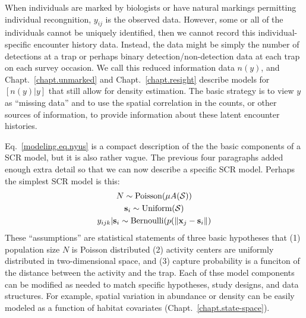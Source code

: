 When individuals are marked by biologists or have natural markings
permitting individual recongnition, $y_{ij}$ is the observed
data. However, some or all of the individuals cannot be uniquely
identified, then we cannot record this individual-specific encounter
history data. Instead, the data might be simply the number of
detections at a trap or perhaps binary detection/non-detection data at
each trap on each survey occasion. We call this reduced information data $n(y)$, and
Chapt.~\ref{chapt.unmarked} and Chapt.~\ref{chapt.resight} describe
models for $[n(y)|y]$ that still allow for density estimation. The
basic strategy is to view $y$ as ``missing
data'' and to use the spatial correlation in the counts, or other
sources of information, to provide information about these latent
encounter histories.

Eq.~\ref{modeling.eq.nyus} is a compact description of the the basic components of a
SCR model, but it is also rather vague. The previous four paragraphs
added enough extra detail so that we can now describe a specific SCR
model. Perhaps the simplest SCR model is this:
\begin{gather}
N \sim \text{Poisson}(\mu A(\mathcal{S})) \nonumber \\
{\bf s}_{i} \sim \mbox{Uniform}({\cal S}) \label{modeling.eq.scr0} \\
y_{ijk} | {\bf s}_{i} \sim \mbox{Bernoulli}(p(\| {\bf x}_j - {\bf s}_{i} \|) \nonumber
\end{gather}
These ``assumptions'' are statistical statements of three basic hypotheses
that (1) population size $N$ is Poisson distributed
(2) activity centers are uniformly distributed in two-dimensional
space,
and (3) capture probability is a funciton of the distance
between the activity and the trap. Each of thse model components can be
modified as needed to match specific hypotheses, study designs, and data
structures. For example, spatial variation in abundance or density can
be easily modeled as a function of habitat covariates
(Chapt.~\ref{chapt.state-space}). %

